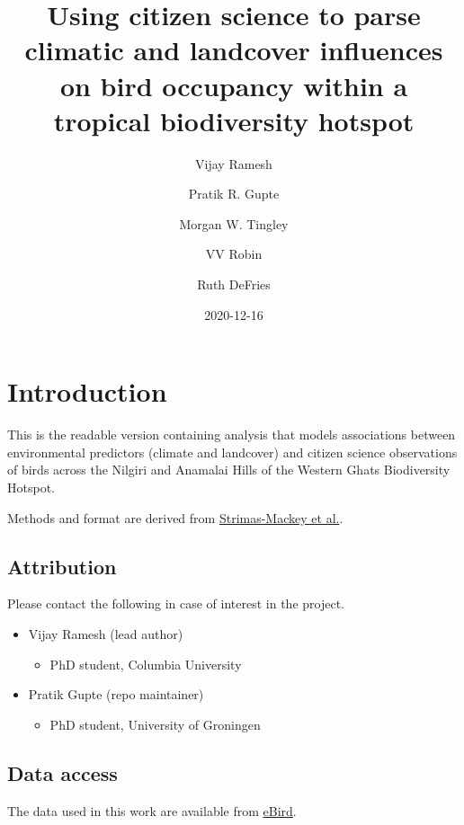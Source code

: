 \documentclass[]{article}
\title{Using citizen science to parse climatic and landcover influences on bird occupancy within a tropical biodiversity hotspot}
\author{Vijay Ramesh \and Pratik R. Gupte \and Morgan W. Tingley \and VV Robin \and Ruth DeFries}
\date{2020-12-16}
\providecommand{\tightlist}{%
  \setlength{\itemsep}{0pt}\setlength{\parskip}{0pt}}
\begin{document}
\maketitle

{
\setcounter{tocdepth}{2}
\tableofcontents
}
\hypertarget{introduction}{%
\section{Introduction}\label{introduction}}

This is the readable version containing analysis that models associations between environmental predictors (climate and landcover) and citizen science observations of birds across the Nilgiri and Anamalai Hills of the Western Ghats Biodiversity Hotspot.

Methods and format are derived from \href{https://cornelllabofornithology.github.io/ebird-best-practices/}{Strimas-Mackey et al.}.

\hypertarget{attribution}{%
\subsection{Attribution}\label{attribution}}

Please contact the following in case of interest in the project.

\begin{itemize}
\tightlist
\item
  Vijay Ramesh (lead author)

  \begin{itemize}
  \tightlist
  \item
    PhD student, Columbia University
  \end{itemize}
\item
  Pratik Gupte (repo maintainer)

  \begin{itemize}
  \tightlist
  \item
    PhD student, University of Groningen
  \end{itemize}
\end{itemize}

\hypertarget{data-access}{%
\subsection{Data access}\label{data-access}}

The data used in this work are available from \href{http://ebird.org/data/download}{eBird}.
\end{document}
